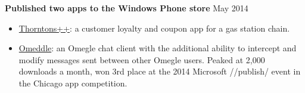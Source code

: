 \documentclass[margin]{res}
\begin{document}
\begin{resume}
{\bf Published two apps to the Windows Phone store} \hfill May 2014
\begin{itemize} \itemsep -2pt  %
\item \underline{Thorntons++}: a customer loyalty and coupon app for a gas station chain.
\item \underline{Omeddle}: an Omegle chat client with the additional ability to intercept and modify messages sent between other Omegle users. Peaked at 2,000 downloads a month, won 3rd place at the 2014 Microsoft //publish/ event in the Chicago app competition.
\end{itemize}

\end{resume}
\end{document}
